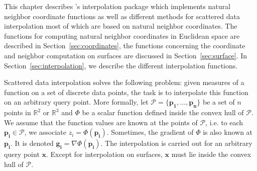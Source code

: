 
This chapter describes \cgal's interpolation package which implements
natural neighbor coordinate functions as well as different
methods for scattered data interpolation most of which are based on
natural neighbor coordinates. The functions for computing natural neighbor 
coordinates in Euclidean space are described in 
Section~\ref{sec:coordinates}, 
the functions concerning the coordinate and neighbor 
computation on surfaces are discussed in Section~\ref{sec:surface}. 
In Section~\ref{sec:interpolation}, we describe the different interpolation 
functions.   

Scattered data interpolation solves the following problem: given
measures of a function on a set of discrete data points, the task is
to interpolate this function on an arbitrary query point.
More formally, let $\mathcal{P}=\{\mathbf{p_1},\ldots ,\mathbf{p_n}\}$ be a set of
$n$ points in $\mathbb{R}^2$ or $\mathbb{R}^3$ and $\Phi$ be a scalar
function defined inside the convex hull of $\mathcal{P}$. We assume that
the function values are known at the points of $\mathcal{P}$, i.e. to
each $\mathbf{p_i} \in \mathcal{P}$, we associate $z_i =
\Phi(\mathbf{p_i})$. Sometimes, the gradient of $\Phi$ is also known
at $\mathbf{p_i}$. It is denoted $\mathbf{g_i}= \nabla
\Phi(\mathbf{p_i})$. The interpolation is carried out for an arbitrary query point
$\mathbf{x}$. Except for interpolation on surfaces, $\mathbf{x}$ must lie 
inside the convex hull of $\mathcal{P}$.
